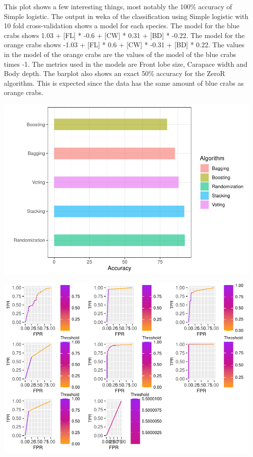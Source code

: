 \documentclass[
]{article}
\begin{document}
This plot shows a few interesting things, most notably the 100\%
accuracy of Simple logistic. The output in weka of the classification
using Simple logistic with 10 fold cross-validation shows a model for
each species. The model for the blue crabs shows 1.03 + {[}FL{]} * -0.6
+ {[}CW{]} * 0.31 + {[}BD{]} * -0.22. The model for the orange crabs
shows -1.03 + {[}FL{]} * 0.6 + {[}CW{]} * -0.31 + {[}BD{]} * 0.22. The
values in the model of the orange crabs are the values of the model of
the blue crabs times -1. The metrics used in the models are Front lobe
size, Carapace width and Body depth. The barplot also shows an exact
50\% accuracy for the ZeroR algorithm. This is expected since the data
has the same amount of blue crabs as orange crabs.

\begin{center}\includegraphics{CrabProject_files/figure-latex/unnamed-chunk-2-1} \end{center}
\newpage

\begin{center}\includegraphics{CrabProject_files/figure-latex/rocs of algorithms-1} \end{center}
\end{document}
